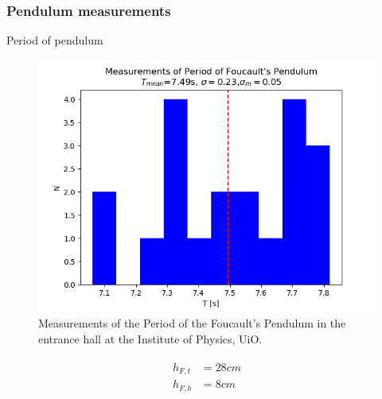 \documentclass[11pt,a4paper]{article}
\begin{document}
  \subsubsection{Pendulum measurements}
    \begin{table}[H]
      \center
      \caption{Period of pendulum}
      \label{tab:pendel}
      
    \end{table}
    \begin{figure}[H]
      \center
      \includegraphics[scale=0.7]{scripts/figs/period.png}
      \caption{Measurements of the Period of the Foucault's Pendulum in the entrance hall at the Institute of Physics, UiO.}
      \label{fig:pendel}
    \end{figure}

    \begin{align}
      \begin{split}
        h_{F, t} &= 28cm \\
        h_{F, b} &= 8cm \\
        \label{eqn:pend_height}
      \end{split}
    \end{align}
\end{document}

